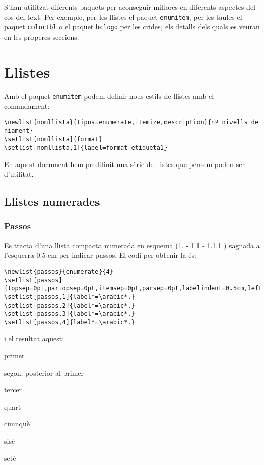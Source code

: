 \documentclass[a4paper,%
                             twoside,%
                             BCOR1.0cm,%
                             DIV11,%
                             parskip=full,%
                             11pt]{scrbook}
\begin{document}
S'han utilitzat diferents paquets per aconseguir millores en diferents aspectes del cos del text. Per exemple, per les llistes el paquet \verb+enumitem+, per les taules el paquet \verb+colortbl+ o el paquet \verb+bclogo+ per les crides,  els detalls dels quals es veuran en les properes seccions.

\section{Llistes}\label{sec:llistes}
Amb el paquet \verb+enumitem+ podem definir nous estils de llistes amb el comandament:
\begin{tiny}
\begin{verbatim}
\newlist{nomllista}{tipus=enumerate,itemize,description}{nº nivells de niament} 
\setlist[nomllista]{format}
\setlist[nomllista,1]{label=format etiqueta1}
\end{verbatim}
\end{tiny}

En aquest document hem predifinit una sèrie de llistes que pensem poden ser d'utilitat.

\subsection{Llistes numerades}\label{sbsec:llistnum}
\subsubsection{Passos}\label{ssbsec:passos}
Es tracta d'una llista compacta numerada en esquema (1. - 1.1 - 1.1.1 ) sagnada a l'esquerra 0.5 cm per indicar passos. El codi per obtenir-la és:
\begin{tiny}
\begin{verbatim}
\newlist{passos}{enumerate}{4}
\setlist[passos]{topsep=0pt,partopsep=0pt,itemsep=0pt,parsep=0pt,labelindent=0.5cm,leftmargin=*}
\setlist[passos,1]{label*=\arabic*.}
\setlist[passos,2]{label*=\arabic*.}
\setlist[passos,3]{label*=\arabic*.}
\setlist[passos,4]{label*=\arabic*.}
\end{verbatim}
\end{tiny}
i el resultat aquest:
\begin{passos}
\item  primer
\item  segon, posterior al primer
\item  tercer
\item  quart
\item  cimnquè
\item  sisè
\item  setè
\end{passos}
\end{document}
